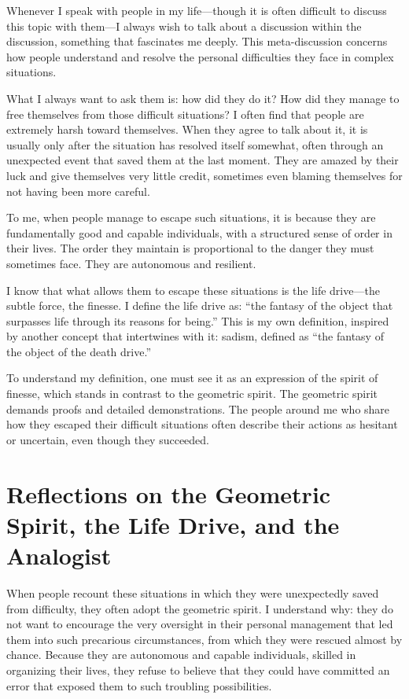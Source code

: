 \documentclass[12pt,oneside]{article}
\begin{document}
Whenever I speak with people in my life—though it is often difficult to discuss this topic with them—I always wish to talk about a discussion within the discussion, something that fascinates me deeply. This meta-discussion concerns how people understand and resolve the personal difficulties they face in complex situations.

What I always want to ask them is: how did they do it? How did they manage to free themselves from those difficult situations? I often find that people are extremely harsh toward themselves. When they agree to talk about it, it is usually only after the situation has resolved itself somewhat, often through an unexpected event that saved them at the last moment. They are amazed by their luck and give themselves very little credit, sometimes even blaming themselves for not having been more careful.

To me, when people manage to escape such situations, it is because they are fundamentally good and capable individuals, with a structured sense of order in their lives. The order they maintain is proportional to the danger they must sometimes face. They are autonomous and resilient.

I know that what allows them to escape these situations is the life drive—the subtle force, the finesse. I define the life drive as: “the fantasy of the object that surpasses life through its reasons for being.” This is my own definition, inspired by another concept that intertwines with it: sadism, defined as “the fantasy of the object of the death drive.”

To understand my definition, one must see it as an expression of the spirit of finesse, which stands in contrast to the geometric spirit. The geometric spirit demands proofs and detailed demonstrations. The people around me who share how they escaped their difficult situations often describe their actions as hesitant or uncertain, even though they succeeded.

\section{Reflections on the Geometric Spirit, the Life Drive, and the Analogist}

When people recount these situations in which they were unexpectedly saved from difficulty, they often adopt the geometric spirit. I understand why: they do not want to encourage the very oversight in their personal management that led them into such precarious circumstances, from which they were rescued almost by chance. Because they are autonomous and capable individuals, skilled in organizing their lives, they refuse to believe that they could have committed an error that exposed them to such troubling possibilities.
\end{document}
